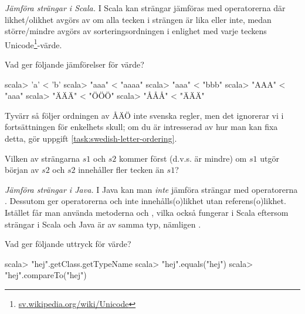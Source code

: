 

\Exercise{\ExeWeekTEN}

\begin{Goals}
\item 
\end{Goals}

\begin{Preparations}
\item 
\end{Preparations}

\BasicTasks %

\Task \label{task:string-order-operators}\emph{Jämföra strängar i Scala.} I Scala kan strängar jämföras med operatorerna \code{== != < <= > >=}  där likhet/olikhet avgörs av om alla tecken i strängen är lika eller inte, medan större/mindre avgörs av sorteringsordningen i enlighet med varje teckens Unicode\footnote{\href{https://sv.wikipedia.org/wiki/Unicode}{sv.wikipedia.org/wiki/Unicode}}-värde. 

\Subtask Vad ger följande jämförelser för värde?
\begin{REPL}
scala> 'a' < 'b'
scala> "aaa" < "aaaa"
scala> "aaa" < "bbb"
scala> "AAA" < "aaa"
scala> "ÄÄÄ" < "ÖÖÖ"
scala> "ÅÅÅ" < "ÄÄÄ"
\end{REPL}
Tyvärr så följer ordningen av ÅÄÖ inte svenska regler, men det ignorerar vi i fortsättningen för enkelhets skull; om du är intresserad av hur man kan fixa  detta, gör uppgift \ref{task:swedish-letter-ordering}. 

\Subtask\Pen Vilken av strängarna $s1$ och $s2$ kommer först (d.v.s. är mindre) om $s1$ utgör början av $s2$ och $s2$ innehåller fler tecken än $s1$? 


\Task \emph{Jämföra strängar i Java.} I Java kan man \emph{inte} jämföra strängar med operatorerna \code{< <= > >=}. Dessutom ger operatorerna \code{==} och \code{!=} inte innehålls(o)likhet utan referens(o)likhet. Istället får man använda metoderna  och , vilka också fungerar i Scala eftersom strängar i Scala och Java är av samma typ, nämligen .


\Subtask Vad ger följande uttryck för värde?

\begin{REPL}
scala> "hej".getClass.getTypeName
scala> "hej".equals("hej")
scala> "hej".compareTo("hej")
\end{REPL}


